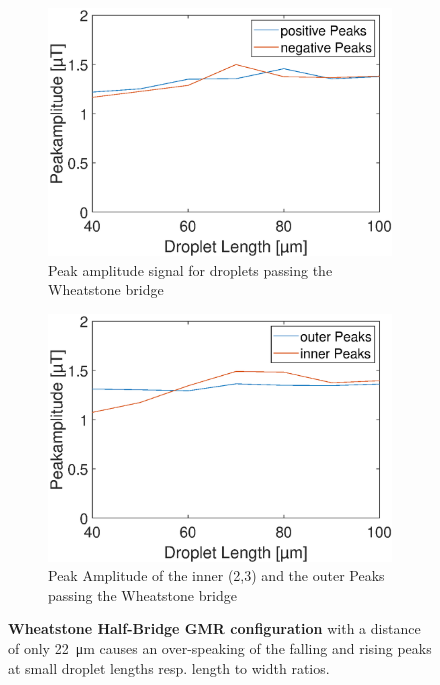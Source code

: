 \begin{figure}[h]
	\vfil
	\begin{subfigure}[r]{0.49\linewidth} 
		\centering
		\includegraphics[clip,trim={0mm 0mm 0mm 0mm}, width=\linewidth]{Ressourcen/Results/L-22/Ampl}
		\caption{Peak amplitude signal for droplets passing the Wheatstone bridge}
		\label{fig:sim:l:bridge:ampl}
	\end{subfigure}
	\hfil
	\begin{subfigure}[r]{0.49\linewidth} 
		\centering
		\includegraphics[clip,trim={0mm 0mm 0mm 0mm}, width=\linewidth]{Ressourcen/Results/L-22/Ampl_in_out}
		\caption{Peak Amplitude of the inner (2,3) and the outer Peaks passing the Wheatstone bridge}
		\label{fig:sim:l:shape}
	\end{subfigure}
	\caption{\textbf{Wheatstone Half-Bridge GMR configuration} with a distance of only \SI{22}{\micro\meter} causes an over-speaking of the falling and rising peaks at small droplet lengths resp. length to width ratios.}
	\label{fig:sim:l:bridge}
\end{figure}
\clearpage
\newpage
